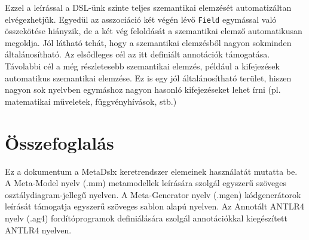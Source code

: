 \documentclass[12pt, a4paper]{report}
\newcommand{\f}[1]{\texttt{#1}}
\begin{document}
Ezzel a leírással a DSL-ünk szinte teljes szemantikai elemzését automatizáltan elvégezhetjük. Egyedül az asszociáció két végén lévő \f{Field} egymással való összekötése hiányzik, de a két vég feloldását a szemantikai elemző automatikusan megoldja. Jól látható tehát, hogy a szemantikai elemzésből nagyon sokminden általánosítható. Az elsődleges cél az itt definiált annotációk támogatása. Távolabbi cél a még részletesebb szemantikai elemzés, például a kifejezések automatikus szemantikai elemzése. Ez is egy jól általánosítható terület, hiszen nagyon sok nyelvben egymáshoz nagyon hasonló kifejezéseket lehet írni (pl. matematikai műveletek, függvényhívások, stb.)


\chapter{Összefoglalás}

Ez a dokumentum a MetaDslx keretrendszer elemeinek használatát mutatta be. A Meta-Model nyelv (.mm) metamodellek leírására szolgál egyszerű szöveges osztálydiagram-jellegű nyelven. A Meta-Generator nyelv (.mgen) kódgenerátorok leírását támogatja egyszerű szöveges sablon alapú nyelven. Az Annotált ANTLR4 nyelv (.ag4) fordítóprogramok definiálására szolgál annotációkkal kiegészített ANTLR4 nyelven.



\end{document}
